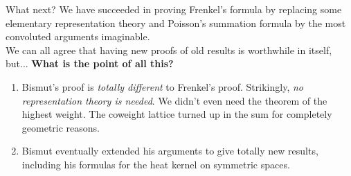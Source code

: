 \documentclass{beamer}
\numberwithin{equation}{section}
\theoremstyle{plain}
\theoremstyle{plain}
\theoremstyle{definition}
\theoremstyle{plain}
\theoremstyle{plain}
\theoremstyle{definition}
\begin{document}
\begin{frame}{What next?}
  We have succeeded in proving Frenkel's formula by replacing some elementary representation theory and Poisson's summation formula by the most convoluted arguments imaginable. \\
  
  We can all agree that having new proofs of old results is worthwhile in itself, but...
  \textbf{What is the point of all this?}
  \begin{enumerate}
    \item{} Bismut's proof is \emph{totally different} to Frenkel's proof. Strikingly, \emph{no representation theory is needed}. We didn't even need the theorem of the highest weight. The coweight lattice turned up in the sum for completely geometric reasons.
    \item{} Bismut eventually extended his arguments to give totally new results, including his formulas for the heat kernel on symmetric spaces.
  \end{enumerate}
\end{frame}


\begin{frame}
\end{frame}
\end{document}
